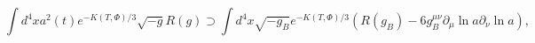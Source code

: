 \begin{equation}
\int d^4 x a^2(t) e^{-K(T,\Phi)/3}\sqrt{-g} R(g)\supset \int d^4x
\sqrt{-g_B}e^{-K(T,\Phi)/3}(R(g_B)-6g_B^{\mu\nu}\partial_\mu\ln
a\partial_{\nu}\ln a),
\end{equation}


